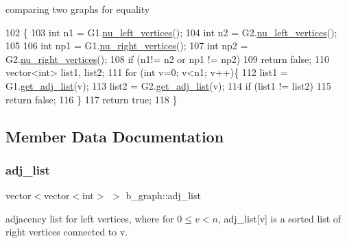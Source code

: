 comparing two graphs for equality 


\begin{DoxyCode}
102 \{
103   \textcolor{keywordtype}{int} n1 = G1.\hyperlink{classb__graph_a5e71d5c97f2501b0b93c17146cf7e68e}{nu\_left\_vertices}();
104   \textcolor{keywordtype}{int} n2 = G2.\hyperlink{classb__graph_a5e71d5c97f2501b0b93c17146cf7e68e}{nu\_left\_vertices}();
105   
106   \textcolor{keywordtype}{int} np1 = G1.\hyperlink{classb__graph_abecfd7d6fbd0d9a554fe0d9aa3241a04}{nu\_right\_vertices}();
107   \textcolor{keywordtype}{int} np2 = G2.\hyperlink{classb__graph_abecfd7d6fbd0d9a554fe0d9aa3241a04}{nu\_right\_vertices}();
108   \textcolor{keywordflow}{if} (n1!= n2 or np1 != np2)
109     \textcolor{keywordflow}{return} \textcolor{keyword}{false};
110   vector<int> list1, list2;
111   \textcolor{keywordflow}{for} (\textcolor{keywordtype}{int} v=0; v<n1; v++)\{
112     list1 = G1.\hyperlink{classb__graph_aa81c7179b9c6cb4986c4b41e84a85799}{get\_adj\_list}(v);
113     list2 = G2.\hyperlink{classb__graph_aa81c7179b9c6cb4986c4b41e84a85799}{get\_adj\_list}(v);
114     \textcolor{keywordflow}{if} (list1 != list2)
115       \textcolor{keywordflow}{return} \textcolor{keyword}{false};
116   \}
117   \textcolor{keywordflow}{return} \textcolor{keyword}{true};
118 \}
\end{DoxyCode}


\subsection{Member Data Documentation}
\mbox{\label{classb__graph_a2a89d2e8f958270952aab2e8769b7342}} 
\subsubsection{\texorpdfstring{adj\+\_\+list}{adj\_list}}
{\footnotesize\ttfamily vector$<$vector$<$int$>$ $>$ b\+\_\+graph\+::adj\+\_\+list\hspace{0.3cm}{\ttfamily [private]}}



adjacency list for left vertices, where for $0 \leq v < n $, adj\+\_\+list\mbox{[}v\mbox{]} is a sorted list of right vertices connected to v. 

\mbox{\label{classb__graph_a311d16462dbb10c47b3a6c80a42139d9}} 
